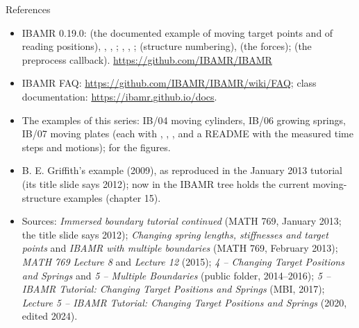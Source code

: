 \documentclass[aspectratio=169,11pt]{beamer}
\begin{document}
\begin{frame}{References}
\label{fr:refs}
\scriptsize
\begin{itemize}
  \item IBAMR 0.19.0:  (the documented example of moving target points and of reading positions), , , ; , , ;  (structure numbering),  (the forces);  (the preprocess callback). \url{https://github.com/IBAMR/IBAMR}
  \item IBAMR FAQ: \url{https://github.com/IBAMR/IBAMR/wiki/FAQ}; class documentation: \url{https://ibamr.github.io/docs}.
  \item The examples of this series: IB/04 moving cylinders, IB/06 growing springs, IB/07 moving plates (each with , , ,  and a README with the measured time steps and motions);  for the figures.
  \item B. E. Griffith's  example (2009), as reproduced in the January 2013 tutorial (its title slide says 2012); now  in the IBAMR tree holds the current moving-structure examples (chapter 15).
  \item Sources: \emph{Immersed boundary tutorial continued} (MATH 769, January 2013; the title slide says 2012); \emph{Changing spring lengths, stiffnesses and target points} and \emph{IBAMR with multiple boundaries} (MATH 769, February 2013); \emph{MATH 769 Lecture 8} and \emph{Lecture 12} (2015); \emph{4 -- Changing Target Positions and Springs} and \emph{5 -- Multiple Boundaries} (public folder, 2014--2016); \emph{5 -- IBAMR Tutorial: Changing Target Positions and Springs} (MBI, 2017); \emph{Lecture 5 -- IBAMR Tutorial: Changing Target Positions and Springs} (2020, edited 2024).
\end{itemize}
\end{frame}
\end{document}
